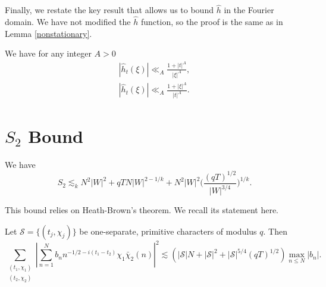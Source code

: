 Finally, we restate the key result that allows us to bound $\hat{h}$ in the Fourier domain. We have not modified the $\hat{h}$ function, so the proof is the same as in Lemma \ref{nonstationary}.
\begin{lemma*}
    \label{nonstationarynew}
    We have for any integer $A>0$\begin{align*}
        |\hat{h}_t(\xi)|\ll_A \frac{1+|t|^A}{|\xi|^A},\\
        |\hat{h}_t(\xi)|\ll_A \frac{1+|\xi|^A}{|t|^A}. 
    \end{align*}
\end{lemma*}
\section{$S_2$ Bound}

\begin{proposition}[Bound on $S_2$]\label{s2bound}
    We have \[
    S_2 \lesssim_k N^2|W|^2 + qTN|W|^{2-1/k} + N^2|W|^2 \Big(\frac{(qT)^{1/2}}{|W|^{3/4}}\Big)^{1/k}.
    \]
\end{proposition}
This bound relies on Heath-Brown's theorem. We recall its statement here.
\begin{theorem*}
	Let $\mathcal{S}=\{(t_j,\chi_j)\}$ be one-separate, primitive characters of modulus $q$. Then 
	\[
	\sum_{\substack{(t_1,\chi_1)\\(t_2,\chi_2)}}\left|\sum_{n=1}^{N} b_n n^{-1/2 -i(t_1-t_2)}\chi_1\bar{\chi}_2(n)\right|^2 \lesssim  (|\mathcal{S}|N+ |\mathcal{S}|^2 + |\mathcal{S}|^{5/4}(qT)^{1/2}) \max_{n\leq N} |b_n|.
	\]
\end{theorem*}

